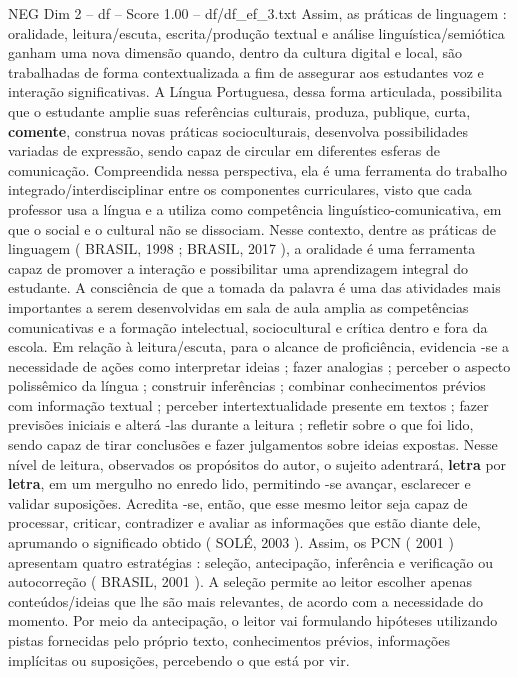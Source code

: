 \begin{textsample}{NEG Dim 2 – df – Score 1.00 – df/df\_ef\_3.txt}
Assim, as práticas de linguagem : oralidade, leitura/escuta, escrita/produção textual e análise linguística/semiótica ganham uma nova dimensão quando, dentro da cultura digital e local, são trabalhadas de forma contextualizada a fim de assegurar aos estudantes voz e interação significativas.
A Língua Portuguesa, dessa forma articulada, possibilita que o estudante amplie suas referências culturais, produza, publique, curta, \textbf{comente}, construa novas práticas socioculturais, desenvolva possibilidades variadas de expressão, sendo capaz de circular em diferentes esferas de comunicação.
Compreendida nessa perspectiva, ela é uma ferramenta do trabalho integrado/interdisciplinar entre os componentes curriculares, visto que cada professor usa a língua e a utiliza como competência linguístico-comunicativa, em que o social e o cultural não se dissociam.
Nesse contexto, dentre as práticas de linguagem ( BRASIL, 1998 ; BRASIL, 2017 ), a oralidade é uma ferramenta capaz de promover a interação e possibilitar uma aprendizagem integral do estudante.
A consciência de que a tomada da palavra é uma das atividades mais importantes a serem desenvolvidas em sala de aula amplia as competências comunicativas e a formação intelectual, sociocultural e crítica dentro e fora da escola.
Em relação à leitura/escuta, para o alcance de proficiência, evidencia -se a necessidade de ações como interpretar ideias ; fazer analogias ; perceber o aspecto polissêmico da língua ; construir inferências ; combinar conhecimentos prévios com informação textual ; perceber intertextualidade presente em textos ; fazer previsões iniciais e alterá -las durante a leitura ; refletir sobre o que foi lido, sendo capaz de tirar conclusões e fazer julgamentos sobre ideias expostas.
Nesse nível de leitura, observados os propósitos do autor, o sujeito adentrará, \textbf{letra} por \textbf{letra}, em um mergulho no enredo lido, permitindo -se avançar, esclarecer e validar suposições.
Acredita -se, então, que esse mesmo leitor seja capaz de processar, criticar, contradizer e avaliar as informações que estão diante dele, aprumando o significado obtido ( SOLÉ, 2003 ).
Assim, os PCN ( 2001 ) apresentam quatro estratégias : seleção, antecipação, inferência e verificação ou autocorreção ( BRASIL, 2001 ).
A seleção permite ao leitor escolher apenas conteúdos/ideias que lhe são mais relevantes, de acordo com a necessidade do momento.
Por meio da antecipação, o leitor vai formulando hipóteses utilizando pistas fornecidas pelo próprio texto, conhecimentos prévios, informações implícitas ou suposições, percebendo o que está por vir.

\end{textsample}
